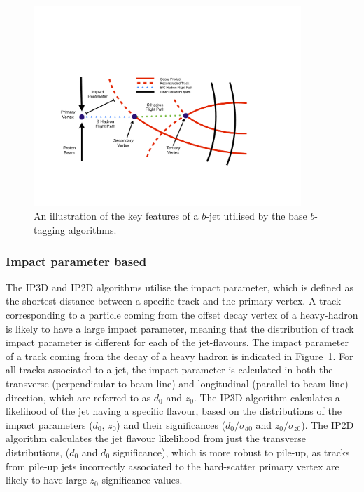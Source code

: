 \begin{figure}[!htb]
  \begin{center}
    \includegraphics[width=0.9\textwidth]{figs/Objects/bjets_schem.pdf}
    \caption{An illustration of the key features of a $b$-jet utilised by the base $b$-tagging algorithms.}
    \label{fig:obj_bjets_schem}
  \end{center}
  \vspace{-0.5cm}
\end{figure}

\subsubsection{Impact parameter based}
\label{sec:obj-bjets_IP}

The IP3D and IP2D algorithms utilise the impact parameter, which is defined as the shortest distance between a specific track and the primary vertex.
A track corresponding to a particle coming from the offset decay vertex of a heavy-hadron is likely to have a large impact parameter,
meaning that the distribution of track impact parameter is different for each of the jet-flavours.
The impact parameter of a track coming from the decay of a heavy hadron is indicated in Figure~\ref{fig:obj_bjets_schem}.
For all tracks associated to a jet, the impact parameter is calculated in both the transverse (perpendicular to beam-line)
and longitudinal (parallel to beam-line) direction, which are referred to as $d_{0}$ and $z_{0}$.
The IP3D algorithm calculates a likelihood of the jet having a specific flavour, 
based on the distributions of the impact parameters ($d_{0}$, $z_{0}$) and their significances 
($d_{0}/\sigma _{d0}$ and  $z_{0}/\sigma_{z0}$). 
The IP2D algorithm calculates the jet flavour likelihood from just the transverse distributions, ($d_{0}$ and $d_{0}$ significance), which is more
robust to pile-up, as tracks from pile-up jets incorrectly associated to the hard-scatter primary vertex are likely to have large $z_{0}$ significance values.

